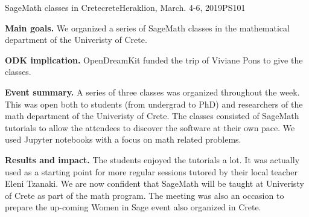 \begin{event}{SageMath classes in Crete}{crete}{Heraklion, March. 4-6, 2019}{PS}{10}{1}{}

\textbf{Main goals.} We organized a series of SageMath classes in the mathematical department of the Univeristy of Crete.

\textbf{ODK implication.} OpenDreamKit funded the trip of Viviane Pons to give the classes.

\textbf{Event summary.} A series of three classes was organized throughout the week. This was open both to students (from undergrad to PhD) and researchers of the math department of the Univeristy of Crete. The classes consisted of SageMath tutorials to allow the attendees to discover the software at their own pace. We used Jupyter notebooks with a focus on math related problems.

\textbf{Results and impact.} The students enjoyed the tutorials a lot. It was actually used as a starting point for more regular sessions tutored by their local teacher Eleni Tzanaki. We are now confident that SageMath will be taught at Univeristy of Crete as part of the math program.  The meeting was also an occasion to prepare the up-coming Women in Sage event also organized in Crete. 

\end{event}
